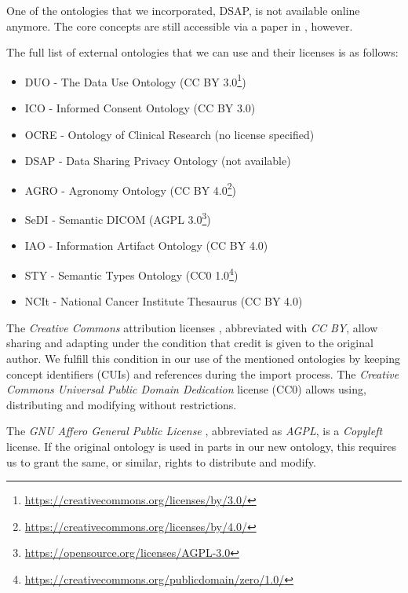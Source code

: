 \documentclass[10pt]{article}
\begin{document}
One of the ontologies that we incorporated, DSAP, is not available online anymore. The core concepts are still accessible via a paper in \cite{dsap}, however.

The full list of external ontologies that we can use and their licenses is as follows:

\begin{itemize}
    \item DUO - The Data Use Ontology \cite{duo} (CC BY 3.0\footnote{\url{https://creativecommons.org/licenses/by/3.0/}})
    \item ICO - Informed Consent Ontology \cite{ico} (CC BY 3.0)
    \item OCRE - Ontology of Clinical Research \cite{ocre} (no license specified)
    \item DSAP - Data Sharing Privacy Ontology \cite{dsap} (not available)
    \item AGRO - Agronomy Ontology \cite{agro} (CC BY 4.0\footnote{\url{https://creativecommons.org/licenses/by/4.0/}})
    \item SeDI - Semantic DICOM \cite{sedi} (AGPL 3.0\footnote{\url{https://opensource.org/licenses/AGPL-3.0}})
    \item IAO - Information Artifact Ontology \cite{iao} (CC BY 4.0)
    \item STY - Semantic Types Ontology \cite{sty} (CC0 1.0\footnote{\url{https://creativecommons.org/publicdomain/zero/1.0/}})
    \item NCIt - National Cancer Institute Thesaurus \cite{ncit} (CC BY 4.0)
\end{itemize}

The \textit{Creative Commons} attribution licenses \cite{cc}, abbreviated with \textit{CC BY}, allow sharing and adapting under the condition that credit is given to the original author. We fulfill this condition in our use of the mentioned ontologies by keeping concept identifiers (CUIs) and references during the import process. The \textit{Creative Commons Universal Public Domain Dedication} license (CC0) \cite{cc} allows using, distributing and modifying without restrictions.

The \textit{GNU Affero General Public License} \cite{agpl}, abbreviated as \textit{AGPL}, is a \textit{Copyleft} license. If the original ontology is used in parts in our new ontology, this requires us to grant the same, or similar, rights to distribute and modify. 
\end{document}

